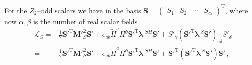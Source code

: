 For the $Z_2$--odd scalars we have in the basis
$
  \mathbf{S}=
  \begin{pmatrix}
    S_1&
    S_2&
    \cdots&
    S_{\alpha}
  \end{pmatrix}^{\operatorname{T}}
$, where now $\alpha,\beta$ is the number of real scalar fields
\begin{align*}
    \mathcal{L}_S=&\frac{1}{2}{\mathbf{S}'}^{\operatorname{T}}{\mathbf{M}'}_S^2\mathbf{S}'
+ \epsilon_{ab}\widetilde{H}^a H^b {\mathbf{S}'}^{\operatorname{T}}\boldsymbol{\lambda}^{\prime SH}\mathbf{S}' 
+ S'_{\gamma}\left( {\mathbf{S}'}^{\operatorname{T}}\boldsymbol{\lambda}^{\prime S}\mathbf{S}' \right)_{\gamma\delta} S'_{\delta} \nonumber\\
=&\frac{1}{2}{\mathbf{S}'}^{\operatorname{T}}{\mathbf{M}'}_S^2\mathbf{S}'
+ \epsilon_{ab}\widetilde{H}^a H^b {\mathbf{S}'}^{\operatorname{T}}\boldsymbol{\lambda}^{\prime SH}\mathbf{S}' 
+ \mathbf{S'}^{\operatorname{T}}\left( {\mathbf{S}'}^{\operatorname{T}}\boldsymbol{\lambda}^{\prime S}\mathbf{S}' \right)\mathbf{S'} \,,
\end{align*}


